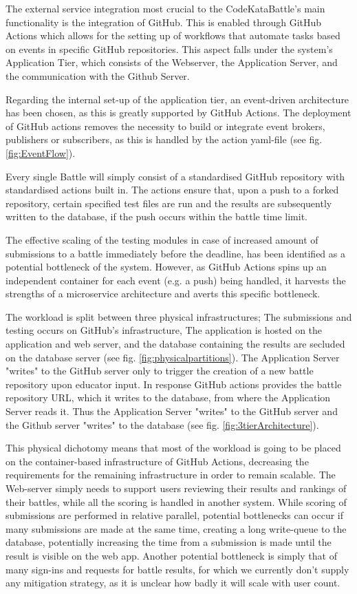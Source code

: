 The external service integration most crucial to the CodeKataBattle's main functionality is the integration of GitHub. This is enabled through GitHub Actions which allows for the setting up of workflows that automate tasks based on events in specific GitHub repositories. This aspect falls under the system's Application Tier, which consists of the Webserver, the Application Server, and the communication with the Github Server. 

Regarding the internal set-up of the application tier, an event-driven architecture has been chosen, as this is greatly supported by GitHub Actions. The deployment of GitHub actions removes the necessity to build or integrate event brokers, publishers or subscribers, as this is handled by the action yaml-file (see fig. \ref{fig:EventFlow}). 

Every single Battle will simply consist of a standardised GitHub repository with standardised actions built in. The actions ensure that, upon a push to a forked repository, certain specified test files are run and the results are subsequently written to the database, if the push occurs within the battle time limit. 

The effective scaling of the testing modules in case of increased amount of submissions to a battle immediately before the deadline, has been identified as a potential bottleneck of the system. However, as GitHub Actions spins up an independent container for each event (e.g. a push) being handled, it harvests the strengths of a microservice architecture and averts this specific bottleneck.

The workload is split between three physical infrastructures; The submissions and testing occurs on GitHub’s infrastructure, The application is hosted on the application and web server, and the database containing the results are secluded on the database server (see fig. \ref{fig:physicalpartitions}). 
The Application Server "writes" to the GitHub server only to trigger the creation of a new battle repository upon educator input. In response GitHub actions provides the battle repository URL, which it writes to the database, from where the Application Server reads it. Thus the Application Server "writes" to the GitHub server and the Github server "writes" to the database (see fig. \ref{fig:3tierArchitecture}).

This physical dichotomy means that most of the workload is going to be placed on the container-based infrastructure of GitHub Actions, decreasing the requirements for the remaining infrastructure in order to remain scalable. The Web-server simply needs to support users reviewing their results and rankings of their battles, while all the scoring is handled in another system. While scoring of submissions are performed in relative parallel, potential bottlenecks can occur if many submissions are made at the same time, creating a long write-queue to the database, potentially increasing the time from a submission is made until the result is visible on the web app. Another potential bottleneck is simply that of many sign-ins and requests for battle results, for which we currently don't supply any mitigation strategy, as it is unclear how badly it will scale with user count.

